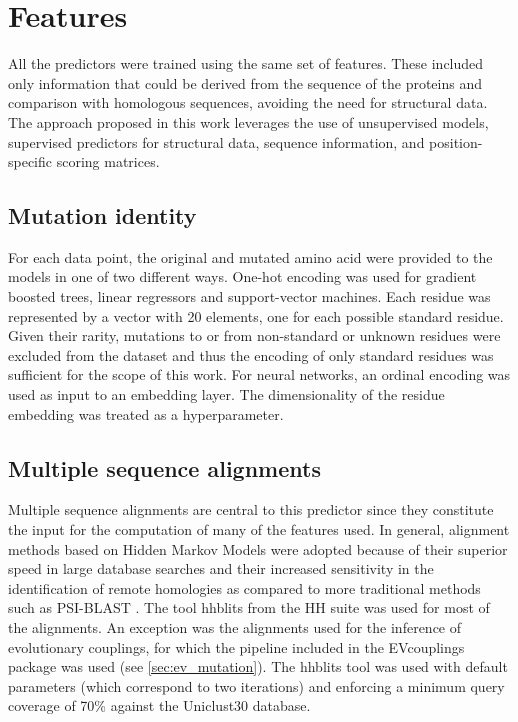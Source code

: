 \FloatBarrier%
\section{Features}
All the predictors were trained using the same set of features.
These included only information that could be derived from the sequence of the proteins and comparison with homologous sequences, avoiding the need for structural data.
The approach proposed in this work leverages the use of unsupervised models, supervised predictors for structural data, sequence information, and position-specific scoring matrices.

\subsection{Mutation identity}
For each data point, the original and mutated amino acid were provided to the models in one of two different ways.
One-hot encoding was used for gradient boosted trees, linear regressors and support-vector machines.
Each residue was represented by a vector with 20 elements, one for each possible standard residue.
Given their rarity, mutations to or from non-standard or unknown residues were excluded from the dataset and thus the encoding of only standard residues was sufficient for the scope of this work.
For neural networks, an ordinal encoding was used as input to an embedding layer.
The dimensionality of the residue embedding was treated as a hyperparameter.

\subsection{Multiple sequence alignments}\label{sec:msa}
Multiple sequence alignments are central to this predictor since they constitute the input for the computation of many of the features used.
In general, alignment methods based on Hidden Markov Models were adopted because of their superior speed in large database searches and their increased sensitivity in the identification of remote homologies as compared to more traditional methods such as PSI-BLAST \parencite[see the introduction of][and references therein]{Steinegger2019}.
The tool hhblits from the HH suite was used for most of the alignments.
An exception was the alignments used for the inference of evolutionary couplings, for which the pipeline included in the EVcouplings package was used (see \cref{sec:ev_mutation}).
The hhblits tool was used with default parameters (which correspond to two iterations) and enforcing a minimum query coverage of 70\% against the Uniclust30 database.

